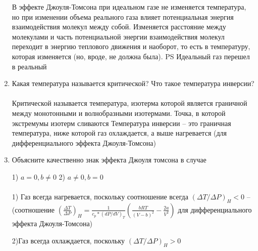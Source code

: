 \documentclass[a4paper,12pt]{article} %
\begin{document}
\begin{enumerate}
В эффекте Джоуля-Томсона при идеальном газе  не изменяется температура, но при изменении объема реального газа влияет потенциальная энергия взаимодействия молекул между собой. Изменяется расстояние между молекулами и часть потенциальной энергии взаимодействия молекул переходит в энергию теплового движения и наоборот, то есть в температуру, которая изменяется (но, вроде, не должна была). 
PS Идеальный газ перешел в реальный

\item Какая температура называется критической? Что такое температура инверсии?\\ \\
Критической называется температура, изотерма которой является граничной между монотонными и волнобразными изотермами. Точка, в которой экстремумы изотерм сливаются
Температура инверсии -- это граничная температура, ниже которой газ охлаждается, а выше нагревается (для дифференциального эффекта Джоуля-Томсона)
\item Объясните качественно знак эффекта Джоуля томсона в случае
 
 1) $a = 0,b \not= 0$
 2) $a \not= 0,b = 0$\\ \\
 1) Газ всегда нагревается, поскольку соотношение всегда $(\Delta T/\Delta P)_H<0$ -- (соотношение $(\frac{\Delta T}{\Delta P})_H=\frac{1}{c_p * (dP/dV)_T}(\frac{bRT}{(V-b)^2}-\frac{2a}{V^2})$ для дифференциального эффекта Джоуля-Томсона)
 
 2)Газ всегда охлаждается, поскольку $(\Delta T/\Delta P)_H>0$
\end{enumerate}
\end{document}
